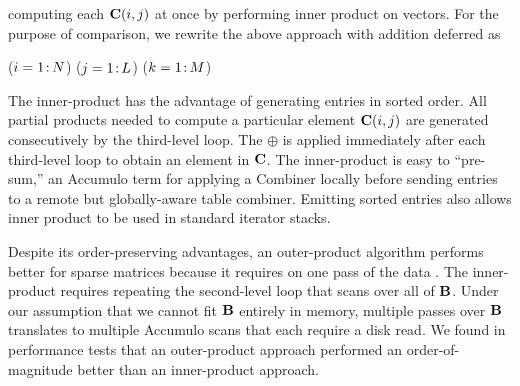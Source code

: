 \noindent computing each $\mathbf{C}(i,j)$ at once by performing inner product on vectors.
For the purpose of comparison, we rewrite the above approach with addition deferred as

\removelatexerror
\begin{algorithm}[H]
\vspace{\algspace}
\fore($i = 1\colon\! N$){
\fore($j = 1\colon\! L$){
\fore($k = 1\colon\! M$){
}}}
\vspace{\algspace}
\end{algorithm}

The inner-product has the advantage of generating entries in sorted order.  All partial products needed 
to compute a particular element $\mathbf{C}(i,j)$ are generated consecutively by the third-level loop.
The $\oplus$ is applied immediately after each third-level loop to obtain an element in $\mathbf{C}$.
The inner-product is easy to ``pre-sum,'' an Accumulo term for applying a Combiner
locally before sending entries to a remote but globally-aware table combiner.
Emitting sorted entries also allows inner product to be used in standard iterator stacks.

Despite its order-preserving advantages, an outer-product algorithm performs better for sparse matrices 
because it requires on one pass of the data \cite{burkhardt2013big}\cite{burkhardt2014asking}.  The inner-product requires repeating
the second-level loop that scans over all of $\mathbf{B}$.
Under our assumption that we cannot fit $\mathbf{B}$ entirely in memory,
multiple passes over $\mathbf{B}$ translates to multiple Accumulo scans that each require a disk read.
We found in performance tests that an outer-product approach performed an order-of-magnitude better than an inner-product approach.


